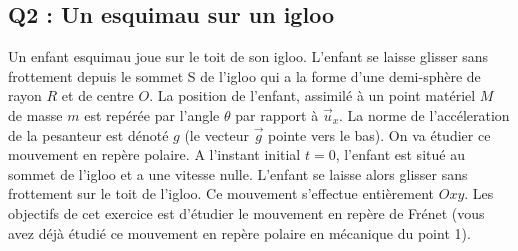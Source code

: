 \documentclass[french,10pt]{article}
\begin{document}
	\begin{figure}
	\centering	
		\caption{}
		\label{fig:plan_xz}
	\end{figure}
	
	\FloatBarrier
	
	\subsection*{Q2 : Un esquimau sur un igloo}
	Un enfant esquimau joue sur le toit de son igloo. L’enfant se laisse glisser sans frottement depuis le sommet S de l’igloo qui a la forme d’une demi-sphère de rayon $R$ et de centre $O$. La position de l'enfant, assimilé à un point matériel $M$ de masse $m$ est repérée par l’angle $\theta$ par rapport à $\vec{u}_x$. La norme de l'accéleration de la pesanteur est dénoté $g$ (le vecteur $\Vec{g}$ pointe vers le bas). On va étudier ce mouvement en repère polaire. A l’instant initial $t = 0$, l’enfant est situé au sommet de l’igloo et a une vitesse nulle. L’enfant se laisse alors glisser sans frottement sur le toit
	de l’igloo. Ce mouvement s’effectue entièrement $Oxy$. Les objectifs de cet exercice est d'étudier le mouvement en repère de Frénet (vous avez déjà étudié ce mouvement en repère polaire en mécanique du point 1). 
\end{document}
